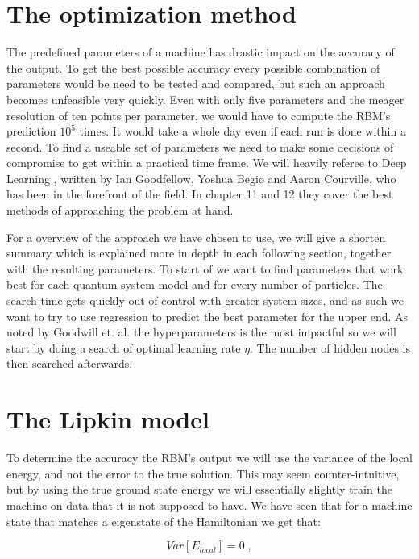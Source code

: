 \section{The optimization method}

The predefined parameters of a machine has drastic impact on the accuracy of the output. To get the best possible accuracy every possible combination of parameters would be need to be tested and compared, but such an approach becomes unfeasible very quickly. Even with only five parameters and the meager resolution of ten points per parameter, we would have to compute the RBM's prediction $10^5$ times. It would take a whole day even if each run is done within a second. To find a useable set of parameters we need to make some decisions of compromise to get within a practical time frame. We will heavily referee to Deep Learning \cite{Goodfellow}, written by Ian Goodfellow, Yoshua Begio and Aaron Courville, who has been in the forefront of the field. In chapter 11 and 12 they cover the best methods of approaching the problem at hand.

\vspace{\baselineskip}
For a overview of the approach we have chosen to use, we will give a shorten summary which is explained more in depth in each following section, together with the resulting parameters. To start of we want to find parameters that work best for each quantum system model and for every number of particles. The search time gets quickly out of control with greater system sizes, and as such we want to try to use regression to predict the best parameter for the upper end. As noted by Goodwill et. al. the hyperparameters is the most impactful so we will start by doing a search of optimal learning rate $\eta$. The number of hidden nodes is then searched afterwards.
\section{The Lipkin model}\label{sec:opt_lipkin}
\def \optgridwidhtratio {0.8}
\def \eat {\eta}
To determine the accuracy the RBM's output we will use the variance of the local energy, and not the error to the true solution. This may seem counter-intuitive, but by using the true ground state energy we will essentially slightly train the machine on data that it is not supposed to have. We have seen that for a machine state that matches a eigenstate of the Hamiltonian we get that:

$$Var[E_{local}] = 0 \;,$$

